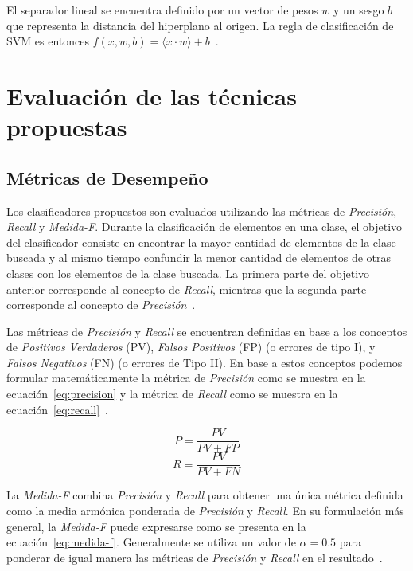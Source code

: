 \documentclass[runningheads,a4paper]{llncs}
\begin{document}
El separador lineal se encuentra definido por un vector de pesos $w$ y un sesgo $b$ que representa la distancia del hiperplano al origen. La regla de clasificación de SVM es entonces $f(x,w,b)=\langle x \cdot w \rangle+b$~\cite{MATA07}.

\section{Evaluación de las técnicas propuestas}
\label{sec:Resultados}

\subsection{Métricas de Desempeño}
\label{sec:metricas}
Los clasificadores propuestos son evaluados utilizando las métricas de \emph{Precisión}, \emph{Recall} y \emph{Medida-F}. Durante la clasificación de elementos en una clase, el objetivo del clasificador consiste en encontrar la mayor cantidad de elementos de la clase buscada y al mismo tiempo confundir la menor cantidad de elementos de otras clases con los elementos de la clase buscada. La primera parte del objetivo anterior corresponde al concepto de \emph{Recall}, mientras que la segunda parte corresponde al concepto de \emph{Precisi\'on}~\cite{RAGHAVAN89}.

Las métricas de \emph{Precisión} y \emph{Recall} se encuentran definidas en base a los conceptos de \emph{Positivos Verdaderos} (PV), \emph{Falsos Positivos} (FP) (o errores de tipo I), y \emph{Falsos Negativos} (FN) (o errores de Tipo II).  En base a estos conceptos podemos formular matemáticamente la métrica de \emph{Precisión} como se muestra en la ecuación~\ref{eq:precision} y la métrica de \emph{Recall} como se muestra en la ecuación~\ref{eq:recall}~\cite{BIRD09}.

\begin{equation}
	\label{eq:precision}
	P = \frac{PV}{PV + FP}
\end{equation}
\begin{equation}
	\label{eq:recall}
	R = \frac{PV}{PV + FN}
\end{equation}

La \emph{Medida-F} combina \emph{Precisi\'on} y \emph{Recall} para obtener una \'unica m\'etrica definida como la media arm\'onica ponderada de \emph{Precisi\'on} y \emph{Recall}. En su formulaci\'on m\'as general, la \emph{Medida-F} puede expresarse como se presenta en la ecuaci\'on~\ref{eq:medida-f}. Generalmente se utiliza un valor de $\alpha=0.5$ para ponderar de igual manera las métricas de  \emph{Precisi\'on} y \emph{Recall} en el resultado~\cite{MAKHOUL99}.
\end{document}
